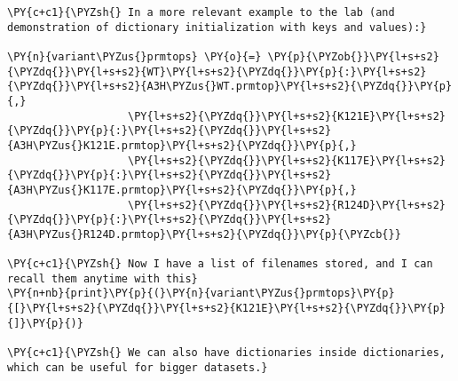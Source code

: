     \begin{tcolorbox}[breakable, size=fbox, boxrule=1pt, pad at break*=1mm,colback=cellbackground, colframe=cellborder]
\begin{Verbatim}[commandchars=\\\{\}]
\PY{c+c1}{\PYZsh{} In a more relevant example to the lab (and demonstration of dictionary initialization with keys and values):}

\PY{n}{variant\PYZus{}prmtops} \PY{o}{=} \PY{p}{\PYZob{}}\PY{l+s+s2}{\PYZdq{}}\PY{l+s+s2}{WT}\PY{l+s+s2}{\PYZdq{}}\PY{p}{:}\PY{l+s+s2}{\PYZdq{}}\PY{l+s+s2}{A3H\PYZus{}WT.prmtop}\PY{l+s+s2}{\PYZdq{}}\PY{p}{,}
                   \PY{l+s+s2}{\PYZdq{}}\PY{l+s+s2}{K121E}\PY{l+s+s2}{\PYZdq{}}\PY{p}{:}\PY{l+s+s2}{\PYZdq{}}\PY{l+s+s2}{A3H\PYZus{}K121E.prmtop}\PY{l+s+s2}{\PYZdq{}}\PY{p}{,}
                   \PY{l+s+s2}{\PYZdq{}}\PY{l+s+s2}{K117E}\PY{l+s+s2}{\PYZdq{}}\PY{p}{:}\PY{l+s+s2}{\PYZdq{}}\PY{l+s+s2}{A3H\PYZus{}K117E.prmtop}\PY{l+s+s2}{\PYZdq{}}\PY{p}{,}
                   \PY{l+s+s2}{\PYZdq{}}\PY{l+s+s2}{R124D}\PY{l+s+s2}{\PYZdq{}}\PY{p}{:}\PY{l+s+s2}{\PYZdq{}}\PY{l+s+s2}{A3H\PYZus{}R124D.prmtop}\PY{l+s+s2}{\PYZdq{}}\PY{p}{\PYZcb{}}

\PY{c+c1}{\PYZsh{} Now I have a list of filenames stored, and I can recall them anytime with this}
\PY{n+nb}{print}\PY{p}{(}\PY{n}{variant\PYZus{}prmtops}\PY{p}{[}\PY{l+s+s2}{\PYZdq{}}\PY{l+s+s2}{K121E}\PY{l+s+s2}{\PYZdq{}}\PY{p}{]}\PY{p}{)}

\PY{c+c1}{\PYZsh{} We can also have dictionaries inside dictionaries, which can be useful for bigger datasets.}


\end{Verbatim}
\end{tcolorbox}
